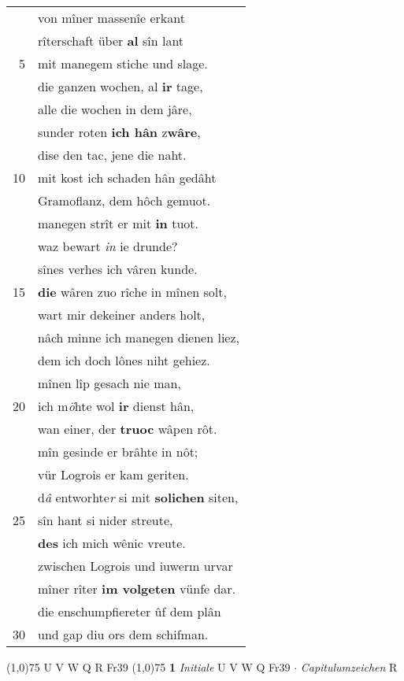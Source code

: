 \documentclass[8pt,a4paper,notitlepage]{article}
\begin{document}
\begin{table}[ht]
\begin{minipage}[t]{0.5\linewidth}
\begin{tabular}{rl}
 & von mîner massenîe erkant\\ 
 & rîterschaft über \textbf{al} sîn lant\\ 
5 & mit manegem stiche und slage.\\ 
 & die ganzen wochen, al \textbf{ir} tage,\\ 
 & alle die wochen in dem jâre,\\ 
 & sunder roten \textbf{ich hân} z\textbf{wâre},\\ 
 & dise den tac, jene die naht.\\ 
10 & mit kost ich schaden hân gedâht\\ 
 & Gramoflanz, dem hôch gemuot.\\ 
 & manegen strît er mit \textbf{in} tuot.\\ 
 & waz bewart \textit{in} ie drunde?\\ 
 & sînes verhes ich vâren kunde.\\ 
15 & \textbf{die} wâren zuo rîche in mînen solt,\\ 
 & wart mir dekeiner anders holt,\\ 
 & nâch minne ich manegen dienen liez,\\ 
 & dem ich doch lônes niht gehiez.\\ 
 & mînen lîp gesach nie man,\\ 
20 & ich m\textit{ö}hte wol \textbf{ir} dienst hân,\\ 
 & wan einer, der \textbf{truoc} wâpen rôt.\\ 
 & mîn gesinde er brâhte in nôt;\\ 
 & vür Logrois er kam geriten.\\ 
 & d\textit{â} entworhte\textit{r} si mit \textbf{solichen} siten,\\ 
25 & sîn hant si nider streute,\\ 
 & \textbf{des} ich mich wênic vreute.\\ 
 & zwischen Logrois und iuwerm urvar\\ 
 & mîner rîter \textbf{im volgeten} vünfe dar.\\ 
 & die enschumpfiereter ûf dem plân\\ 
30 & und gap diu ors dem schifman.\\ 
\end{tabular}
\scriptsize
\line(1,0){75} \newline
U V W Q R Fr39 \newline
\line(1,0){75} \newline
\textbf{1} \textit{Initiale} U V W Q Fr39   $\cdot$ \textit{Capitulumzeichen} R  \newline

\end{minipage}
\end{table}
\end{document}
